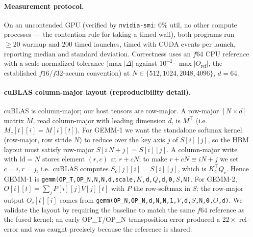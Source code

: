 \documentclass[11pt,a4paper]{article}
\newcommand{\verdict}[1]{\texttt{#1}}
\begin{document}
\paragraph{Measurement protocol.}
On an uncontended GPU (verified by \verdict{nvidia-smi}: 0\% util, no other
compute processes --- the contention rule for taking a timed wall), both
programs run $\geq 20$ warmup and $200$ timed launches, timed with CUDA events
per launch, reporting median and standard deviation. Correctness uses an $f64$
CPU reference with a scale-normalized tolerance (max $|{\Delta}|$ against
$10^{-2}\!\cdot\!\max|O_{\mathrm{ref}}|$, the established $f16$/$f32$-accum
convention) at $N\in\{512,1024,2048,4096\}$, $d{=}64$.

\paragraph{cuBLAS column-major layout (reproducibility detail).}
cuBLAS is column-major; our host tensors are row-major. A row-major
$[N\times d]$ matrix $M$, read column-major with leading dimension $d$, is
$M^\top$ (i.e.\ $M_c[t][i]=M[i][t]$). For GEMM-1 we want the standalone softmax
kernel (row-major, row stride $N$) to reduce over the key axis $j$ of
$S[i][j]$, so the HBM layout must satisfy row-major $S[i\,N+j]=S[i][j]$. A
column-major write with $\mathrm{ld}=N$ stores element $(r,c)$ at $r+cN$; to make
$r+cN \equiv iN+j$ we set $c=i,r=j$, i.e.\ cuBLAS computes $S_c[j][i]=S[i][j]$,
which is $K_c^\top Q_c$. Hence GEMM-1 is
\verdict{gemm(OP\_T,OP\_N,N,N,d,scale,$K$,d,$Q$,d,0,$S$,N)}. For GEMM-2,
$O[i][t]=\sum_j P[i][j]V[j][t]$ with $P$ the row-softmax in $S$; the row-major
output $O_c[t][i]$ comes from \verdict{gemm(OP\_N,OP\_N,d,N,N,1,$V$,d,$S$,N,0,$O$,d)}.
We validate the layout by requiring the baseline to match the same $f64$
reference as the fused kernel; an early OP\_T/OP\_N transposition error produced
a $22\times$ rel-error and was caught precisely because the reference is shared.
\end{document}
